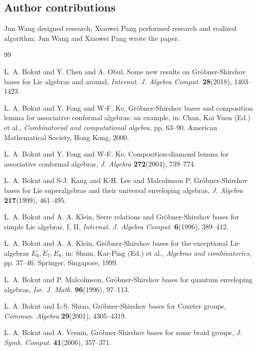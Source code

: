 \documentclass[UTF8]{amsart}
\theoremstyle{definition}
\theoremstyle{remark}
\numberwithin{equation}{section}
\begin{document}
\subsection*{Author contributions}
Jun Wang designed research; Xiaowei Pang performed research and realized algorithm;  Jun Wang and Xiaowei Pang wrote the paper.
\begin{thebibliography}{99}


L. A. Bokut and Y. Chen and A. Obul, Some new results on {G}r\"{o}bner-{S}hirshov bases for {L}ie
              algebras and around, {\it Internat. J. Algebra Comput.} {\bf 28}(2018), 1403--1423.

L. A. Bokut and Y. Fong and W-F. Ke, Gr\"{o}bner-{S}hirshov bases and composition lemma for associative conformal algebras: an example, in: Chan, Kai Yuen (Ed.) et al., \emph{Combinatorial and computational algebra}, pp. 63--90. American Mathematical Society, {H}ong {K}ong, 2000.

L. A. Bokut and Y. Fong and W-F. Ke, Composition-diamond lemma for associative conformal algebras, {\it J. Algebra} {\bf 272}(2004), 739--774.

L. A. Bokut and S-J. Kang  and K-H. Lee and Malcolmson P, Gr\"{o}bner-{S}hirshov bases for {L}ie superalgebras and their universal enveloping algebras, {\it J. Algebra} {\bf 217}(1999), 461--495.

L. A. Bokut and A. A. Klein, Serre relations and {G}r\"{o}bner-{S}hirshov bases for simple {L}ie algebras. {I}, {II}, {\it Internat. J. Algebra Comput.} {\bf 6}(1996), 389--412.

L. A. Bokut and A. A. Klein, Gr\"{o}bner-{S}hirshov bases for the exceptional {L}ie algebras {$E_6,E_7,E_8$}, in: Shum, Kar-Ping (Ed.) et al., \emph{Algebras and combinatorics}, pp. 37--46. Springer, Singapore, 1999.

L. A. Bokut  and P. Malcolmson, Gr\"{o}bner-{S}hirshov bases for quantum enveloping algebras, {\it Isr. J. Math.} {\bf 96}(1996), 97--113.

L. A. Bokut and L-S. Shiao, Gr\"{o}bner-{S}hirshov bases for {C}oxeter groups, {\it Commun. Algebra} {\bf 29}(2001), 4305--4319.

L. A. Bokut and A. Vesnin, Gr\"{o}bner-{S}hirshov bases for some braid groups, {\it J. Symb. Comput.} {\bf 41}(2006), 357--371.


\end{thebibliography}
\end{document}
